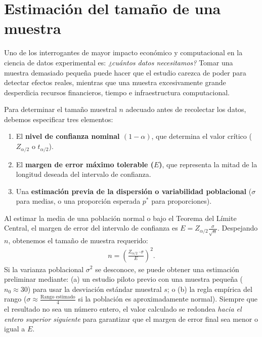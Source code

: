 \section{Estimación del tamaño de una muestra}

Uno de los interrogantes de mayor impacto económico y computacional en la ciencia de datos experimental es: \emph{¿cuántos datos necesitamos?} Tomar una muestra demasiado pequeña puede hacer que el estudio carezca de poder para detectar efectos reales, mientras que una muestra excesivamente grande desperdicia recursos financieros, tiempo e infraestructura computacional.

Para determinar el tamaño muestral $n$ adecuado antes de recolectar los datos, debemos especificar tres elementos:
\begin{enumerate}
	\item El \textbf{nivel de confianza nominal $(1-\alpha)$}, que determina el valor crítico ($Z_{\alpha/2}$ o $t_{\alpha/2}$).
	\item El \textbf{margen de error máximo tolerable ($E$)}, que representa la mitad de la longitud deseada del intervalo de confianza.
	\item Una \textbf{estimación previa de la dispersión o variabilidad poblacional} ($\sigma$ para medias, o una proporción esperada $p^*$ para proporciones).
\end{enumerate}

\begin{teorema}
	Al estimar la media de una población normal o bajo el Teorema del Límite Central, el margen de error del intervalo de confianza es $E = Z_{\alpha/2} \frac{\sigma}{\sqrt{n}}$. Despejando $n$, obtenemos el tamaño de muestra requerido:
	\begin{align}
		n = \left( \frac{Z_{\alpha/2} \cdot \sigma}{E} \right)^2.
		\label{eq:n_media}
	\end{align}
	Si la varianza poblacional $\sigma^2$ se desconoce, se puede obtener una estimación preliminar mediante: (a) un estudio piloto previo con una muestra pequeña ($n_0 \approx 30$) para usar la desviación estándar muestral $s$; o (b) la regla empírica del rango ($\sigma \approx \frac{\text{Rango estimado}}{4}$ si la población es aproximadamente normal). Siempre que el resultado no sea un número entero, el valor calculado se redondea \emph{hacia el entero superior siguiente} para garantizar que el margen de error final sea menor o igual a $E$.
\end{teorema}

